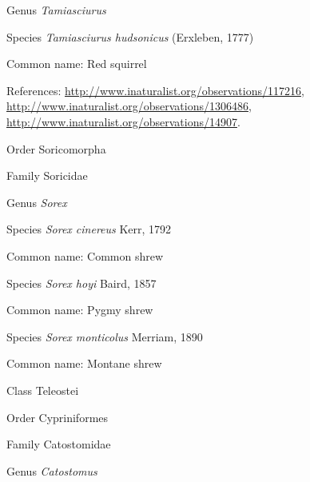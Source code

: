 \documentclass[9pt, article]{memoir}
\begin{document}
\begin{multicols}{2}
\vspace{6pt}\noindent\hspace{30pt}Genus \textit{Tamiasciurus}


\vspace{6pt}\noindent\hspace{36pt}Species \textit{Tamiasciurus hudsonicus} (Erxleben, 1777)


Common name: Red squirrel

References: 
\url{http://www.inaturalist.org/observations/117216}, 
\url{http://www.inaturalist.org/observations/1306486}, 
\url{http://www.inaturalist.org/observations/14907}.

\vspace{6pt}\noindent\hspace{18pt}Order Soricomorpha


\vspace{6pt}\noindent\hspace{24pt}Family Soricidae


\vspace{6pt}\noindent\hspace{30pt}Genus \textit{Sorex}


\vspace{6pt}\noindent\hspace{36pt}Species \textit{Sorex cinereus} Kerr, 1792


Common name: Common shrew

\vspace{6pt}\noindent\hspace{36pt}Species \textit{Sorex hoyi} Baird, 1857


Common name: Pygmy shrew

\vspace{6pt}\noindent\hspace{36pt}Species \textit{Sorex monticolus} Merriam, 1890


Common name: Montane shrew

\vspace{6pt}\noindent\hspace{12pt}Class Teleostei


\vspace{6pt}\noindent\hspace{18pt}Order Cypriniformes


\vspace{6pt}\noindent\hspace{24pt}Family Catostomidae


\vspace{6pt}\noindent\hspace{30pt}Genus \textit{Catostomus}



\end{multicols}
\end{document}

